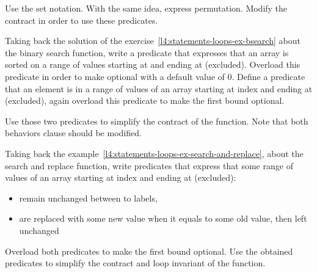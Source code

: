 Use the set notation. With the same idea, express permutation. Modify the
contract in order to use these predicates.




Taking back the solution of the
exercise~\ref{l4:statements-loops-ex-bsearch} about the binary search
function, write a predicate that expresses that an array is sorted on a range of
values starting at  and ending at  (excluded).
Overload this predicate in order to make  optional with a
default value of $0$. Define a predicate that an element is in a range of values
of an array starting at index  and ending at 
(excluded), again overload this predicate to make the first bound optional.

Use those two predicates to simplify the contract of the function. Note that
both behaviors  clause should be modified.





Taking back the example~\ref{l4:statements-loops-ex-search-and-replace}, about
the search and replace function, write predicates that express that some range
of values of an array starting at index  and ending at
 (excluded):

\begin{itemize}
\item remain unchanged between to labels,
\item are replaced with some new value when it equals to some old value, then
  left unchanged
\end{itemize}

Overload both predicates to make the first bound optional. Use the obtained
predicates to simplify the contract and loop invariant of the function.
